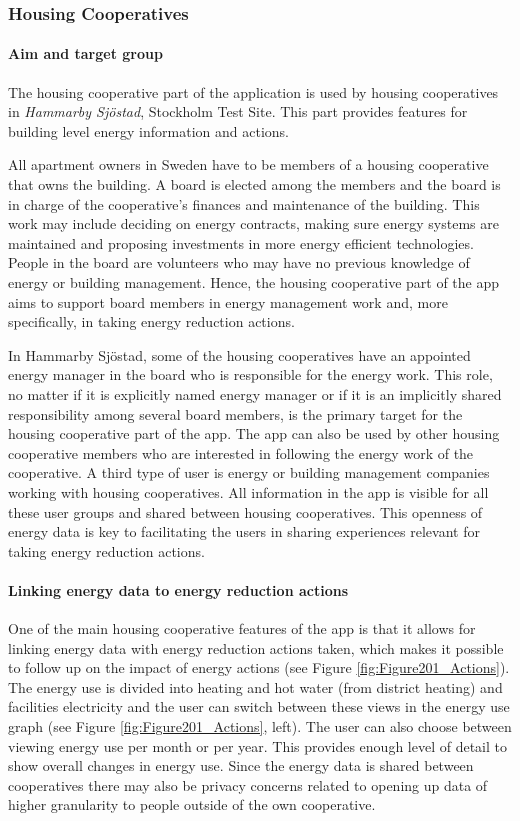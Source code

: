 \subsubsection{Housing Cooperatives}

\paragraph{Aim and target group}

The housing cooperative part of the application is used by housing cooperatives in \textit{Hammarby Sj{\"o}stad}, Stockholm Test Site. This part provides features for building level energy information and actions. 

 All apartment owners in Sweden have to be members of a housing cooperative that owns the building. A board is elected among the members and the board is in charge of the cooperative's finances and maintenance of the building. This work may include deciding on energy contracts, making sure energy systems are maintained and proposing investments in more energy efficient technologies. People in the board are volunteers who may have no previous knowledge of energy or building management. Hence, the housing cooperative part of the app aims to support board members in energy management work and, more specifically, in taking energy reduction actions.

In Hammarby Sj{\"o}stad, some of the housing cooperatives have an appointed energy manager in the board who is responsible for the energy work. This role, no matter if it is explicitly named energy manager or if it is an implicitly shared responsibility among several board members, is the primary target for the housing cooperative part of the app. The app can also be used by other housing cooperative members who are interested in following the energy work of the cooperative. A third type of user is energy or building management companies working with housing cooperatives. All information in the app is visible for all these user groups and shared between housing cooperatives. This openness of energy data is key to facilitating the users in sharing experiences relevant for taking energy reduction actions.

\paragraph{Linking energy data to energy reduction actions}

One of the main housing cooperative features of the app is that it allows for linking energy data with energy reduction actions taken, which makes it possible to follow up on the impact of energy actions (see Figure \ref{fig:Figure201_Actions}). The energy use is divided into heating and hot water (from district heating) and facilities electricity and the user can switch between these views in the energy use graph (see Figure \ref{fig:Figure201_Actions}, left). The user can also choose between viewing energy use per month or per year. This provides enough level of detail to show overall changes in energy use. Since the energy data is shared between cooperatives there may also be privacy concerns related to opening up data of higher granularity to people outside of the own cooperative. 

